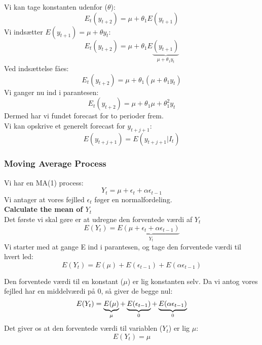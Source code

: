 \documentclass[
  10pt,
]{article}
\begin{document}
Vi kan tage konstanten udenfor (\(\theta\)):\\
\[E_t(y_{t+2}) = \mu + \theta_1E(y_{t+1}) \] Vi indsætter
\(E(y_{t+1}) = \mu + \theta y_t\):\\
\[E_t(y_{t+2}) = \mu + \theta_1E\underbrace{(y_{t+1})}_\text{$\mu + \theta_1 y_t$} \]
Ved indsættelse fåes:\\
\[E_t(y_{t+2}) = \mu + \theta_1(\mu + \theta_1 y_t) \] Vi ganger nu ind
i parantesen: \[E_t(y_{t+2}) = \mu + \theta_1\mu + \theta_1^2 y_t \]
Dermed har vi fundet forecast for to perioder frem.\\
Vi kan opskrive et generelt forecast for \(y_{t+j+1}\):\\
\[E(y_{t+j+1})=E(y_{t+j+1}|I_t) \]

\newpage

\hypertarget{moving-average-process}{%
\subsubsection{Moving Average Process}\label{moving-average-process}}

Vi har en MA(1) process:\\
\[Y_t = \mu + \epsilon_t + \alpha \epsilon_{t-1} \] Vi antager at vores
fejlled \(\epsilon_t\) føger en normalfordeling.\\

\textbf{Calculate the mean of $Y_t$}\\
Det første vi skal gøre er at udregne den forventede værdi af \(Y_t\)\\
\[E(Y_t) = E\underbrace{(\mu + \epsilon_t + \alpha \epsilon_{t-1})}_\text{$Y_t$} \]
Vi starter med at gange E ind i parantesen, og tage den forventede værdi
til hvert led:\\
\[E(Y_t) = E(\mu) + E(\epsilon_{t-1}) + E(\alpha \epsilon_{t-1}) \]

Den forventede værdi til en konstant (\(\mu\)) er lig konstanten selv.
Da vi antog vores fejlled har en middelværdi på 0, så giver de begge
nul:
\[E(Y_t) = \underbrace{E(\mu)}_\text{$\mu$} + \underbrace{E(\epsilon_{t-1})}_\text{0} + \underbrace{E(\alpha \epsilon_{t-1})}_\textsc{0} \]
Det giver os at den forventede værdi til variablen (\(Y_t\)) er lig
\(\mu\):\\
\[E(Y_t) = \mu  \]
\end{document}
